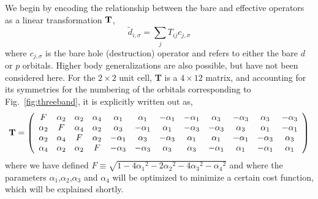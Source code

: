 We begin by encoding the relationship between the bare and effective operators as a linear transformation ${\bf T}$, 
\begin{equation}
	\tilde{d}_{i,\sigma} = \sum_{j} T_{ij} c_{j,\sigma}
\label{eq:dc}
\end{equation}
where $c_{j,\sigma}$ is the bare hole (destruction) operator and refers to either the bare $d$ or $p$ orbitals. 
Higher body generalizations are also possible, but have not been considered here. 
For the $2\times2$ unit cell, {\bf T} is a $4 \times 12 $ matrix, and accounting for its symmetries 
for the numbering of the orbitals corresponding to Fig.~\ref{fig:threeband}, it is explicitly written out as, 
\begin{eqnarray}
{\bf T} = 
\left(
\begin{array}{cccccccccccc}
F        & \alpha_2 &        \alpha_2 &  \alpha_4 & \alpha_1 & \alpha_1 & -\alpha_1 & -\alpha_1 & \alpha_3 & -\alpha_3 & \alpha_3 & -\alpha_3 \\
\alpha_2 &  F       &        \alpha_4 &  \alpha_2 & \alpha_3 & -\alpha_1 & \alpha_1 & -\alpha_3 & -\alpha_3 & \alpha_3 & \alpha_1 & -\alpha_1 \\
\alpha_2 & \alpha_4 & F               &  \alpha_2 & -\alpha_1 & \alpha_3 & -\alpha_3 & \alpha_1 & \alpha_1 & -\alpha_1 & -\alpha_3 & \alpha_3 \\
\alpha_4 & \alpha_2 & \alpha_2        &   F       & -\alpha_3 & -\alpha_3 & \alpha_3 & \alpha_3 & -\alpha_1 & \alpha_1 & -\alpha_1 & \alpha_1 \\
\end{array}
\right)
\end{eqnarray}
where we have defined $F \equiv \sqrt{1-4{\alpha_1}^2 - 2{\alpha_2}^2 - 4 {\alpha_3}^2 -{\alpha_4}^2}$ and 
where the parameters $\alpha_1$,$\alpha_2$,$\alpha_3$ and $\alpha_4$ will be optimized to minimize a 
certain cost function, which will be explained shortly. 

